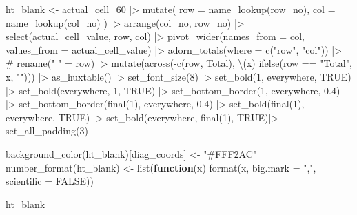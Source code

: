 \documentclass[
  letterpaper,
  DIV=11,
  numbers=noendperiod]{scrartcl}
\newenvironment{Shaded}{\begin{snugshade}}{\end{snugshade}}
\newcommand{\AttributeTok}[1]{\textcolor[rgb]{0.40,0.45,0.13}{#1}}
\newcommand{\CommentTok}[1]{\textcolor[rgb]{0.37,0.37,0.37}{#1}}
\newcommand{\ConstantTok}[1]{\textcolor[rgb]{0.56,0.35,0.01}{#1}}
\newcommand{\ControlFlowTok}[1]{\textcolor[rgb]{0.00,0.23,0.31}{\textbf{#1}}}
\newcommand{\DecValTok}[1]{\textcolor[rgb]{0.68,0.00,0.00}{#1}}
\newcommand{\FloatTok}[1]{\textcolor[rgb]{0.68,0.00,0.00}{#1}}
\newcommand{\FunctionTok}[1]{\textcolor[rgb]{0.28,0.35,0.67}{#1}}
\newcommand{\NormalTok}[1]{\textcolor[rgb]{0.00,0.23,0.31}{#1}}
\newcommand{\OtherTok}[1]{\textcolor[rgb]{0.00,0.23,0.31}{#1}}
\newcommand{\SpecialCharTok}[1]{\textcolor[rgb]{0.37,0.37,0.37}{#1}}
\newcommand{\StringTok}[1]{\textcolor[rgb]{0.13,0.47,0.30}{#1}}
\begin{document}
\begin{Shaded}
\begin{Highlighting}[]
\NormalTok{ht\_blank }\OtherTok{\textless{}{-}}\NormalTok{ actual\_cell\_60 }\SpecialCharTok{|\textgreater{}}
  \FunctionTok{mutate}\NormalTok{(}
    \AttributeTok{row =} \FunctionTok{name\_lookup}\NormalTok{(row\_no),}
    \AttributeTok{col =} \FunctionTok{name\_lookup}\NormalTok{(col\_no)}
\NormalTok{  ) }\SpecialCharTok{|\textgreater{}}
  \FunctionTok{arrange}\NormalTok{(col\_no, row\_no) }\SpecialCharTok{|\textgreater{}}
  \FunctionTok{select}\NormalTok{(actual\_cell\_value, row, col) }\SpecialCharTok{|\textgreater{}} 
  \FunctionTok{pivot\_wider}\NormalTok{(}\AttributeTok{names\_from =}\NormalTok{ col, }\AttributeTok{values\_from =}\NormalTok{ actual\_cell\_value) }\SpecialCharTok{|\textgreater{}}
  \FunctionTok{adorn\_totals}\NormalTok{(}\AttributeTok{where =} \FunctionTok{c}\NormalTok{(}\StringTok{"row"}\NormalTok{, }\StringTok{"col"}\NormalTok{)) }\SpecialCharTok{|\textgreater{}}
  \CommentTok{\# rename(" " = row) |\textgreater{}}
  \FunctionTok{mutate}\NormalTok{(}\FunctionTok{across}\NormalTok{(}\SpecialCharTok{{-}}\FunctionTok{c}\NormalTok{(row, Total), \textbackslash{}(x) }\FunctionTok{ifelse}\NormalTok{(row }\SpecialCharTok{==} \StringTok{"Total"}\NormalTok{, x, }\StringTok{""}\NormalTok{))) }\SpecialCharTok{|\textgreater{}}
  \FunctionTok{as\_huxtable}\NormalTok{() }\SpecialCharTok{|\textgreater{}}
  \FunctionTok{set\_font\_size}\NormalTok{(}\DecValTok{8}\NormalTok{) }\SpecialCharTok{|\textgreater{}}
  \FunctionTok{set\_bold}\NormalTok{(}\DecValTok{1}\NormalTok{, everywhere, }\ConstantTok{TRUE}\NormalTok{) }\SpecialCharTok{|\textgreater{}}
  \FunctionTok{set\_bold}\NormalTok{(everywhere, }\DecValTok{1}\NormalTok{, }\ConstantTok{TRUE}\NormalTok{) }\SpecialCharTok{|\textgreater{}}
  \FunctionTok{set\_bottom\_border}\NormalTok{(}\DecValTok{1}\NormalTok{, everywhere, }\FloatTok{0.4}\NormalTok{) }\SpecialCharTok{|\textgreater{}}
  \FunctionTok{set\_bottom\_border}\NormalTok{(}\FunctionTok{final}\NormalTok{(}\DecValTok{1}\NormalTok{), everywhere, }\FloatTok{0.4}\NormalTok{) }\SpecialCharTok{|\textgreater{}}
  \FunctionTok{set\_bold}\NormalTok{(}\FunctionTok{final}\NormalTok{(}\DecValTok{1}\NormalTok{), everywhere, }\ConstantTok{TRUE}\NormalTok{) }\SpecialCharTok{|\textgreater{}}
  \FunctionTok{set\_bold}\NormalTok{(everywhere, }\FunctionTok{final}\NormalTok{(}\DecValTok{1}\NormalTok{), }\ConstantTok{TRUE}\NormalTok{)}\SpecialCharTok{|\textgreater{}}
  \FunctionTok{set\_all\_padding}\NormalTok{(}\DecValTok{3}\NormalTok{)}

\FunctionTok{background\_color}\NormalTok{(ht\_blank)[diag\_coords] }\OtherTok{\textless{}{-}} \StringTok{"\#FFF2AC"}
\FunctionTok{number\_format}\NormalTok{(ht\_blank) }\OtherTok{\textless{}{-}} \FunctionTok{list}\NormalTok{(}\ControlFlowTok{function}\NormalTok{(x) }\FunctionTok{format}\NormalTok{(x, }\AttributeTok{big.mark =} \StringTok{","}\NormalTok{, }\AttributeTok{scientific =} \ConstantTok{FALSE}\NormalTok{)) }

\NormalTok{ht\_blank}
\end{Highlighting}
\end{Shaded}
\end{document}
